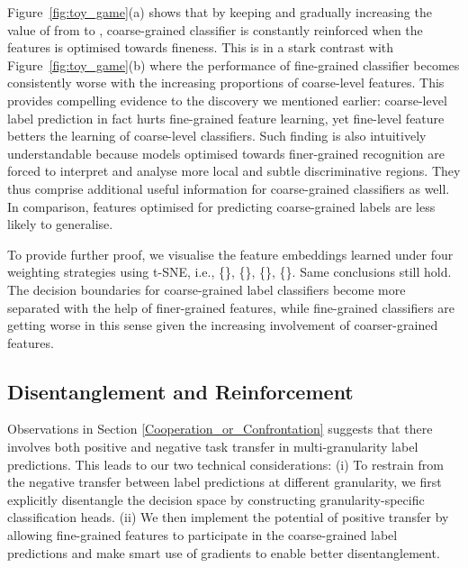 \documentclass[final]{cvpr}
\begin{document}
Figure~\ref{fig:toy_game}(a) shows that by keeping  and gradually increasing the value of  from  to , coarse-grained classifier is constantly reinforced when the features is optimised towards fineness. This is in a stark contrast with Figure~\ref{fig:toy_game}(b) where the performance of fine-grained classifier becomes consistently worse with the increasing proportions of coarse-level features. This provides compelling evidence to the discovery we mentioned earlier: coarse-level label prediction in fact hurts fine-grained feature learning, yet fine-level feature betters the learning of coarse-level classifiers. Such finding is also intuitively understandable because models optimised towards finer-grained recognition are forced to interpret and analyse more local and subtle discriminative regions. They thus comprise additional useful information for coarse-grained classifiers as well. In comparison, features optimised for predicting coarse-grained labels are less likely to generalise.

To provide further proof, we visualise the feature embeddings learned under four weighting strategies using t-SNE, i.e., \{\}, \{\}, \{\}, \{\}. Same conclusions still hold. The decision boundaries for coarse-grained label classifiers become more separated with the help of finer-grained features, while fine-grained classifiers are getting worse in this sense given the increasing involvement of coarser-grained features.



\subsection{Disentanglement and Reinforcement}


Observations in Section \ref{Cooperation_or_Confrontation}  suggests that there involves both positive and negative task transfer in multi-granularity label predictions. This leads to our two technical considerations: (i) To restrain from the negative transfer between label predictions at different granularity,  we first explicitly disentangle the decision space by constructing granularity-specific classification heads. (ii) We then implement the potential of positive transfer by allowing fine-grained features to participate in the coarse-grained label predictions and make smart use of gradients to enable better disentanglement.
\end{document}
